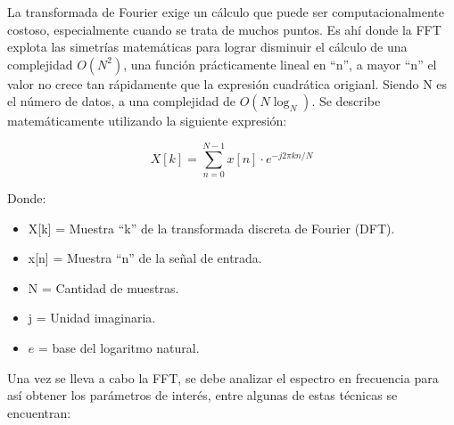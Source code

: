 La transformada de Fourier exige un cálculo que puede ser computacionalmente costoso, especialmente cuando se trata de muchos puntos. Es ahí donde la FFT explota las simetrías matemáticas para lograr disminuir el cálculo de una complejidad $O(N^2)$, una función prácticamente lineal en ``n'', a mayor ``n'' el valor no crece tan rápidamente que la expresión cuadrática origianl. Siendo N es el número de datos, a una complejidad de $O(N\log_{N})$. Se describe matemáticamente utilizando la siguiente expresión:

\begin{equation}
    X[k] = \sum_{n=0}^{N-1} x[n] \cdot e^{-j 2 \pi k n / N}
\end{equation}

Donde:

\begin{itemize}
    \item X[k] = Muestra ``k'' de la transformada discreta de Fourier (DFT).
    \item x[n] = Muestra ``n'' de la señal de entrada.
    \item N = Cantidad de muestras.
    \item j = Unidad imaginaria.
    \item $e$ = base del logaritmo natural.
\end{itemize}

Una vez se lleva a cabo la FFT, se debe analizar el espectro en frecuencia para así obtener los parámetros de interés, entre algunas de estas técnicas se encuentran:

